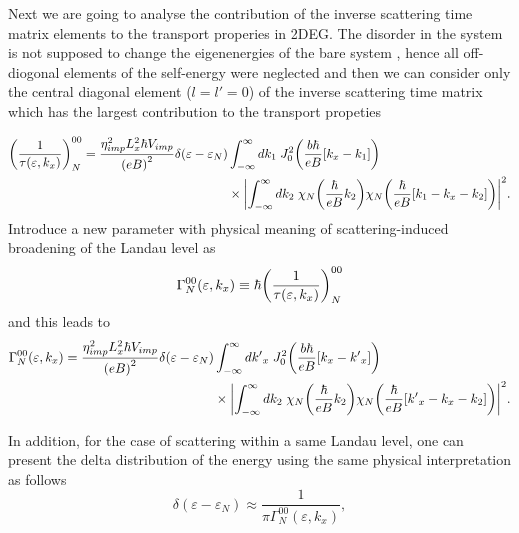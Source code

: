 Next we are going to analyse the contribution of the inverse scattering time matrix elements to the transport properies in 2DEG. The disorder in the system is not supposed to change the eigenenergies of the bare system \cite{wackerl20}, hence all off-diogonal elements of the self-energy were neglected and then we can consider only the central diagonal element (${l=l'=0}$) of the inverse scattering time matrix which has the largest contribution to the transport propeties
\begin{widetext}
  \begin{equation} \label{eq_14}
    \begin{aligned}
      \qty(\frac{1}{\tau(\varepsilon,k_x)})^{00}_{N} =
      \frac { \eta_{imp}^2 L_x^2 \hbar V_{imp}}{\qty(eB)^2}
      \delta(\varepsilon - \varepsilon_{N}) &
      \int_{-\infty}^{\infty} d k_1 \;
      J_0^2\qty(\frac{b\hbar}{eB}[{k}_x -  k_1])
      \\
      & \times
      \qty|
      \int_{-\infty}^{\infty} d k_2 \;
      {\chi}_{N}\qty(\frac{\hbar}{eB}k_2)
      {\chi}_{N}\qty(\frac{\hbar}{eB} \qty[k_1 - {k}_x - k_2])|^2.
    \end{aligned}
  \end{equation}
Introduce a new parameter with physical meaning of scattering-induced broadening of the Landau level as \cite{dini16,endo09}
\begin{equation} \label{eq_15}
 \Gamma^{00}_{N}(\varepsilon,k_x) \equiv \hbar \qty(\frac{1}{\tau(\varepsilon,k_x)})^{00}_{N}
\end{equation}
and this leads to
\begin{equation} \label{eq_16}
 \begin{aligned}
   \Gamma^{00}_{N}(\varepsilon,k_x)  =
   \frac { \eta_{imp}^2 L_x^2 \hbar V_{imp}}{\qty(eB)^2}
   \delta(\varepsilon - \varepsilon_{N}) &
   \int_{-\infty}^{\infty} d {k'}_x \;
   J_0^2\qty(\frac{b\hbar}{eB}[{k}_x - {k'}_x])
   \\
   & \times
   \qty|
   \int_{-\infty}^{\infty} dk_2 \;
   {\chi}_{N}\qty(\frac{\hbar}{eB}k_2)
   {\chi}_{N}\qty(\frac{\hbar}{eB} \qty[{k'}_x - {k}_x - k_2])|^2.
 \end{aligned}
\end{equation}
\end{widetext}
In addition, for the case of scattering within a same Landau level, one can present the delta distribution of the energy using the same physical interpretation \cite{dini16} as follows
\begin{equation} \label{eq_17}
 \delta(\varepsilon - \varepsilon_{N}) \approx
 \frac{1}{\pi \Gamma^{00}_{N}(\varepsilon,k_x)},
\end{equation}
